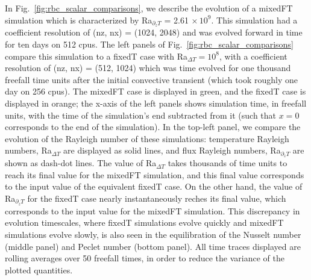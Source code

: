 \documentclass[aps, pre, onecolumn, nofootinbib, notitlepage, groupedaddress, amsfonts, amssymb, amsmath, longbibliography]{revtex4-1}
\begin{document}
In Fig.~\ref{fig:rbc_scalar_comparisons}, we describe the evolution of a mixedFT simulation which is characterized by Ra$_{\partial_z T}$ = 2.61$\,\times 10^9$.
This simulation had a coefficient resolution of (nz, nx) = (1024, 2048) and was evolved forward in time for ten days on 512 cpus.
The left panels of Fig.~\ref{fig:rbc_scalar_comparisons} compare this simulation to a fixedT case with Ra$_{\Delta T} = 10^8$, with a coefficient resolution of (nz, nx) = (512, 1024) which was time evolved for one thousand freefall time units after the initial convective transient (which took roughly one day on 256 cpus).
The mixedFT case is displayed in green, and the fixedT case is displayed in orange; the x-axis of the left panels shows simulation time, in freefall units, with the time of the simulation's end subtracted from it (such that $x = 0$ corresponds to the end of the simulation).
In the top-left panel, we compare the evolution of the Rayleigh number of these simulations: temperature Rayleigh numbers, Ra$_{\Delta T}$ are displayed as solid lines, and flux Rayleigh numbers, Ra$_{\partial_z T}$ are shown as dash-dot lines.
The value of Ra$_{\Delta T}$ takes thousands of time units to reach its final value for the mixedFT simulation, and this final value corresponds to the input value of the equivalent fixedT case.
On the other hand, the value of Ra$_{\partial_z T}$ for the fixedT case nearly instantaneously reches its final value, which corresponds to the input value for the mixedFT simulation.
This discrepancy in evolution timescales, where fixedT simulations evolve quickly and mixedFT simulations evolve slowly, is also seen in the equilibration of the Nusselt number (middle panel) and Peclet number (bottom panel).
All time traces displayed are rolling averages over 50 freefall times, in order to reduce the variance of the plotted quantities.
\end{document}
